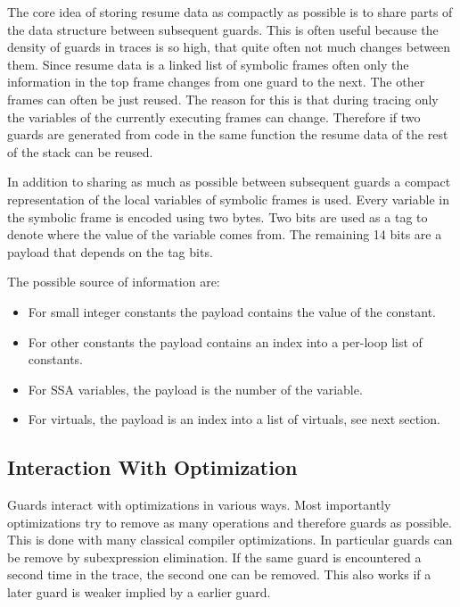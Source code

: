 \documentclass[10pt]{sigplanconf}
\begin{document}
The core idea of storing resume data as compactly as possible
is to share parts of the data structure between subsequent guards.
This is often useful because the density of guards in traces is so high,
that quite often not much changes between them.
Since resume data is a linked list of symbolic frames
often only the information in the top frame changes from one guard to the next.
The other frames can often be just reused.
The reason for this is that during tracing only the variables
of the currently executing frames can change.
Therefore if two guards are generated from code in the same function
the resume data of the rest of the stack can be reused.

In addition to sharing as much as possible between subsequent guards
a compact representation of the local variables of symbolic frames is used.
Every variable in the symbolic frame is encoded using two bytes.
Two bits are used as a tag to denote where the value of the variable
comes from.
The remaining 14 bits are a payload that depends on the tag bits.

The possible source of information are:

\begin{itemize}
    \item For small integer constants
        the payload contains the value of the constant.
    \item For other constants
        the payload contains an index into a per-loop list of constants.
    \item For SSA variables,
        the payload is the number of the variable.
    \item For virtuals,
        the payload is an index into a list of virtuals, see next section.
\end{itemize}


\subsection{Interaction With Optimization}
\label{sub:optimization}

Guards interact with optimizations in various ways.
Most importantly optimizations try to remove as many operations
and therefore guards as possible.
This is done with many classical compiler optimizations.
In particular guards can be remove by subexpression elimination.
If the same guard is encountered a second time in the trace,
the second one can be removed.
This also works if a later guard is weaker implied by a earlier guard.
\end{document}
